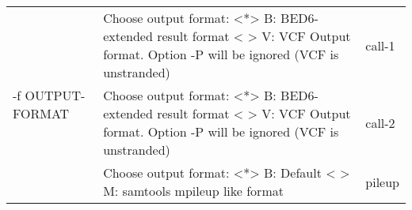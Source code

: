 {\small
\begin{tabular}{@{}p{}p{}l@{}}
\multirow{3}{=}{-f OUTPUT-FORMAT} & Choose output format: \protect\newline
<*> B: BED6-extended result format \protect\newline
< > V: VCF Output format. \protect\newline
Option -P will be ignored (VCF is unstranded)
 & call-1 \\
 & Choose output format: \protect\newline
<*> B: BED6-extended result format \protect\newline
< > V: VCF Output format. \protect\newline
Option -P will be ignored (VCF is unstranded)
 & call-2 \\
 & Choose output format: \protect\newline
<*> B: Default \protect\newline
< > M: samtools mpileup like format
 & pileup \\
\end{tabular}\\
}
